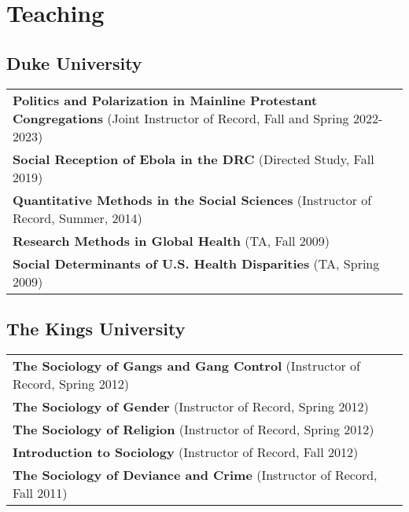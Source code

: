 \section*{Teaching}
\subsection*{Duke University}

\begin{tabular}{p{}}
\textbf{Politics and Polarization in Mainline Protestant Congregations} (Joint Instructor of Record, Fall and Spring 2022-2023)\\
\textbf{Social Reception of Ebola in the DRC} (Directed Study, Fall 2019) \\
\textbf{Quantitative Methods in the Social Sciences} (Instructor of Record, Summer, 2014)\\
\textbf{Research Methods in Global Health} (TA, Fall 2009) \\
\textbf{Social Determinants of U.S. Health Disparities} (TA, Spring 2009)\\
\end{tabular}

\subsection*{The Kings University}

\begin{tabular}{p{}}
\textbf{The Sociology of Gangs and Gang Control} (Instructor of Record, Spring 2012)\\
\textbf{The Sociology of Gender} (Instructor of Record, Spring 2012)\\
\textbf{The Sociology of Religion} (Instructor of Record, Spring 2012)\\
\textbf{Introduction to Sociology} (Instructor of Record, Fall 2012)\\
\textbf{The Sociology of Deviance and Crime} (Instructor of Record, Fall 2011)\\
\end{tabular}



